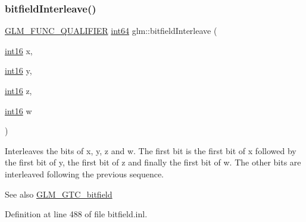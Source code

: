 \subsubsection{\texorpdfstring{bitfieldInterleave()}{bitfieldInterleave()}\hspace{0.1cm}{\footnotesize\ttfamily [15/16]}}
{\footnotesize\ttfamily \mbox{\hyperlink{setup_8hpp_a33fdea6f91c5f834105f7415e2a64407}{G\+L\+M\+\_\+\+F\+U\+N\+C\+\_\+\+Q\+U\+A\+L\+I\+F\+I\+ER}} \mbox{\hyperlink{group__gtc__type__precision_ga435d75819cce297cc5fa21bd84ef89a5}{int64}} glm\+::bitfield\+Interleave (\begin{DoxyParamCaption}\item[{\mbox{\hyperlink{group__gtc__type__precision_ga2945a61d12771f8954994fcddf02b021}{int16}}}]{x,  }\item[{\mbox{\hyperlink{group__gtc__type__precision_ga2945a61d12771f8954994fcddf02b021}{int16}}}]{y,  }\item[{\mbox{\hyperlink{group__gtc__type__precision_ga2945a61d12771f8954994fcddf02b021}{int16}}}]{z,  }\item[{\mbox{\hyperlink{group__gtc__type__precision_ga2945a61d12771f8954994fcddf02b021}{int16}}}]{w }\end{DoxyParamCaption})}

Interleaves the bits of x, y, z and w. The first bit is the first bit of x followed by the first bit of y, the first bit of z and finally the first bit of w. The other bits are interleaved following the previous sequence.

\begin{DoxySeeAlso}{See also}
\mbox{\hyperlink{group__gtc__bitfield}{G\+L\+M\+\_\+\+G\+T\+C\+\_\+bitfield}} 
\end{DoxySeeAlso}


Definition at line 488 of file bitfield.\+inl.

\mbox{\label{group__gtc__bitfield_gac8a926a7bfd9b23c22a4f685193fbfe1}} 
